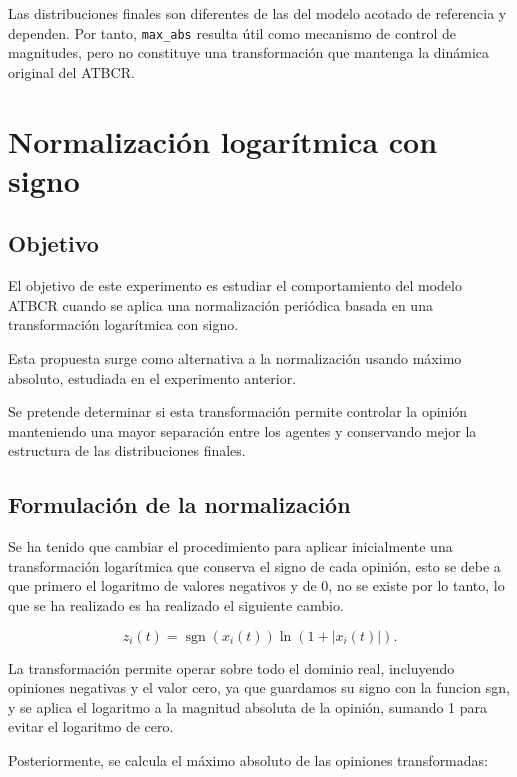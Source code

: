 \documentclass[11pt,a4paper]{article}
\begin{document}
Las distribuciones finales son diferentes de las del modelo acotado de referencia y dependen. Por tanto, \texttt{max\_abs} resulta útil como mecanismo de control de magnitudes, pero no constituye una transformación que mantenga la dinámica original del ATBCR.




\section{Normalización logarítmica con signo}

\subsection{Objetivo}

El objetivo de este experimento es estudiar el comportamiento del modelo ATBCR cuando se aplica una normalización periódica basada en una transformación logarítmica con signo.

Esta propuesta surge como alternativa a la normalización usando máximo absoluto, estudiada en el experimento anterior.

Se pretende determinar si esta transformación permite controlar la opinión manteniendo una mayor separación entre los agentes y conservando mejor la estructura de las distribuciones finales.

\subsection{Formulación de la normalización}

Se ha tenido que cambiar el procedimiento para aplicar inicialmente una transformación logarítmica que conserva el signo de cada opinión, esto se debe a que primero el logaritmo de valores negativos y de 0, no se existe por lo tanto, lo que se ha realizado es ha realizado el siguiente cambio.


\begin{equation}
    z_i(t)=
    \operatorname{sgn}(x_i(t))
    \ln(1+|x_i(t)|).
\end{equation}

La transformación permite operar sobre todo el dominio real, incluyendo opiniones negativas y el valor cero, ya que guardamos su signo con la funcion sgn, y se aplica el logaritmo a la magnitud absoluta de la opinión, sumando 1 para evitar el logaritmo de cero.

Posteriormente, se calcula el máximo absoluto de las opiniones transformadas:
\end{document}
